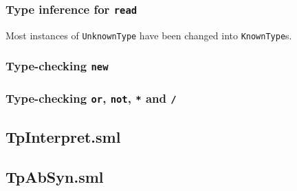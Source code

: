 \documentclass{article}
\newcommand{\Cfile}[4][SML]{ }
\begin{document}
\begin{appendix}
\subsubsection{Type inference for \texttt{read}}
Most instances of \texttt{UnknownType} have been changed into \texttt{KnownType}s.
\Cfile{Type.sml}{179}{283}
%    
\subsubsection{Type-checking \texttt{new}}
\Cfile{Type.sml}{316}{333}
%    
\subsubsection{Type-checking \texttt{or}, \texttt{not}, \texttt{*} and \texttt{/}}
\Cfile{Type.sml}{201}{220}
%    
\Cfile{Type.sml}{265}{283}
%    

\subsection{TpInterpret.sml}
\Cfile{TpInterpret.sml}{121}{129}
%    
\Cfile{TpInterpret.sml}{494}{507}
%    
\Cfile{TpInterpret.sml}{527}{534}
%    

\subsection{TpAbSyn.sml}
\Cfile{TpAbSyn.sml}{163}{183}
%    
\end{appendix}
\end{document}
